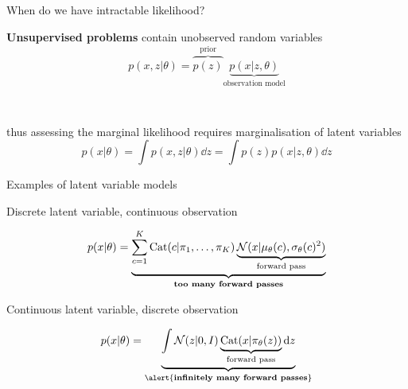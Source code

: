 \documentclass[14pt]{beamer}
\begin{document}
\begin{frame}{When do we have intractable likelihood?}

{\bf Unsupervised problems} contain unobserved random variables\\ 
\begin{equation*}
p(x, z|\theta) = \overbrace{p(z)}^{\text{prior}} \underbrace{p(x|z, \theta)}_{\text{observation model}}
\end{equation*}

~ \pause

thus assessing the marginal likelihood requires \alert{marginalisation of latent variables} 
\begin{equation*}
p(x|\theta) = \int p(x, z|\theta) \dd{z} = \int p(z)p(x|z, \theta) \dd{z} 
\end{equation*}

\end{frame}


\begin{frame}{Examples of latent variable models}

Discrete latent variable, continuous observation
	\begin{small}
	\begin{equation*}
	p(x|\theta) = \underbrace{\sum_{c=1}^K \operatorname{Cat}(c|\pi_1, \ldots, \pi_K) \underbrace{\mathcal N(x|\mu_\theta(c), \sigma_\theta(c)^2)}_{\text{forward pass}}}_{\text{{\bf too many forward passes}}}
	\end{equation*}
	\end{small} 

	\pause
	
Continuous latent variable, discrete observation
	\begin{small}
	\begin{equation*}
	p(x|\theta) = \underbrace{\int \mathcal N(z|0, I) \underbrace{\Cat(x|\pi_\theta(z))}_{\text{forward pass}} \mathrm{d}z }_{\text{\alert{{\bf infinitely many forward passes}}}}
	\end{equation*}
	\end{small}

\end{frame}
\end{document}
